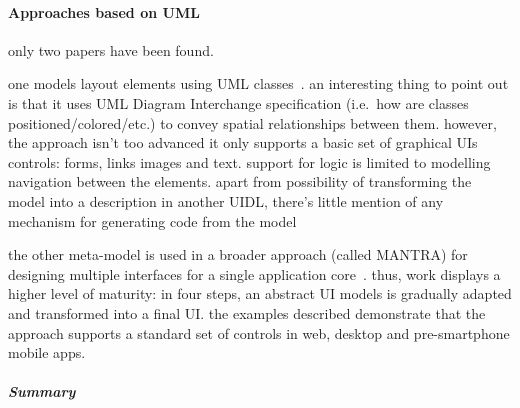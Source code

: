 \paragraph{Approaches based on UML}

only two papers have been found.

one models layout elements using UML classes~\cite{Blankenhorn2004-og}.
an interesting thing to point out is that it uses UML Diagram Interchange specification (i.e.~how are classes positioned/colored/etc.) to convey spatial relationships between them.
however, the approach isn't too advanced\,\textemdash\,it only supports a basic set of graphical UIs controls: forms, links images and text.
support for logic is limited to modelling navigation between the elements.
apart from possibility of transforming the model into a description in another UIDL, there's little mention of any mechanism for generating code from the model

the other meta-model is used in a broader approach (called MANTRA) for designing multiple interfaces for a single application core~\cite{Botterweck2011-ra}.
thus, work displays a higher level of maturity: in four steps, an abstract UI models is gradually adapted and transformed into a final UI\@.
the examples described demonstrate that the approach supports a standard set of controls in web, desktop and pre-smartphone mobile apps.

\subparagraph{Summary}

